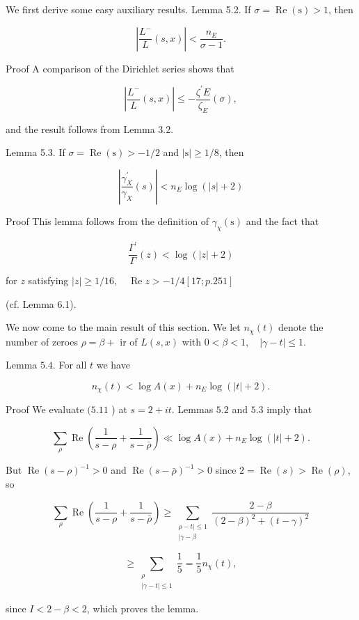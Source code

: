We first derive some easy auxiliary results. Lemma 5.2. If $\sigma=\operatorname{Re}(\mathrm{s})>1$, then

$$
\left|\frac{L^{-}}{L}(s, x)\right|<\frac{n_{E}}{\sigma-1} .
$$

Proof A comparison of the Dirichlet series shows that

$$
\left|\frac{L^{-}}{L}(s, x)\right| \leqslant-\frac{\zeta^{\prime} E}{\zeta_{E}}(\sigma),
$$

and the result follows from Lemma 3.2.

Lemma 5.3. If $\sigma=\operatorname{Re}(\mathrm{s})>-1 / 2$ and $|\mathrm{s}| \geqslant 1 / 8$, then

$$
\left|\frac{\gamma_{X}^{\prime}}{\gamma_{X}}(s)\right|<n_{E} \log (|s|+2)
$$

Proof This lemma follows from the definition of $\gamma_{\chi}(\mathrm{s})$ and the fact that

$$
\frac{\Gamma^{\prime}}{\Gamma}(z)<\log (|z|+2)
$$

for $z$ satisfying $|z| \geq 1 / 16, \quad \operatorname{Re} z>-1 / 4[17 ; p .251]$

(cf. Lemma 6.1).

We now come to the main result of this section. We let $n_{\chi}(t)$ denote the number of zeroes $\rho=\beta+$ ir of $L(s, x)$ with $0<\beta<1, \quad|\gamma-t| \leqslant 1$.

Lemma $5.4$. For all $t$ we have

$$
n_{\chi}(t)<\log A(x)+n_{E} \log (|t|+2) .
$$

Proof We evaluate $(5.11$ ) at $s=2+i t$. Lemmas $5.2$ and $5.3$ imply that

$$
\sum_{\rho} \operatorname{Re}\left(\frac{1}{s-\rho}+\frac{1}{s-\bar{\rho}}\right) \ll \log A(x)+n_{E} \log (|t|+2) .
$$

But $\operatorname{Re}(s-\rho)^{-1}>0$ and $\operatorname{Re}(s-\bar{\rho})^{-1}>0$ since $2=\operatorname{Re}(s)>\operatorname{Re}(\rho)$, so

$$
\sum_{\rho} \operatorname{Re}\left(\frac{1}{s-\rho}+\frac{1}{s-\bar{\rho}}\right) \geqslant \sum_{\substack{\rho-t|\leqslant 1\\| \gamma-\beta}} \frac{2-\beta}{(2-\beta)^{2}+(t-\gamma)^{2}}
$$

$$
\geqslant \sum_{\substack{\rho \\|\gamma-t| \leqslant 1}} \frac{1}{5}=\frac{1}{5} n_{\chi}(t),
$$

since $I<2-\beta<2$, which proves the lemma.

